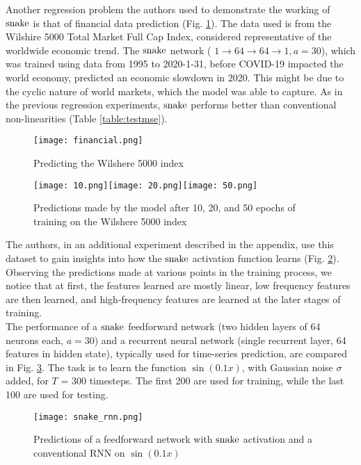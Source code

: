 Another regression problem the authors used to demonstrate the working of $ \operatorname{snake} $ is that of financial data prediction (Fig. \ref{fig:financial}). The data used is from the Wilshire 5000 Total Market Full Cap Index, considered representative of the worldwide economic trend. The $ \operatorname{snake} $ network ( $ 1 \rightarrow 64 \rightarrow 64 \rightarrow 1, a = 30 $), which was trained using data from 1995 to 2020-1-31, before COVID-19 impacted the world economy, predicted an economic slowdown in 2020. This might be due to the cyclic nature of world markets, which the model was able to capture. As in the previous regression experiments, $ \operatorname{snake} $ performs better than conventional non-linearities (Table \ref{table:testmse}).

\begin{figure}[h]
  \centering
  \texttt{[image: financial.png]}
  \caption{Predicting the Wilshere 5000 index}
  \label{fig:financial}
\end{figure}

\begin{figure}[h]
  \centering
  \texttt{[image: 10.png]}\texttt{[image: 20.png]}\texttt{[image: 50.png]}
  \caption{Predictions made by the model after 10, 20, and 50 epochs of training on the Wilshere 5000 index }
  \label{fig:preds_fin}
\end{figure}

The authors, in an additional experiment described in the appendix, use this dataset to gain insights into how the $ \operatorname{snake} $ activation function learns (Fig. \ref{fig:preds_fin}).
Observing the predictions made at various points in the training process, we notice that at first, the features learned are mostly linear, low frequency features are then learned, and high-frequency features are learned at the later stages of training. \\

 The performance of a $ \operatorname{snake} $ feedforward network (two hidden layers of 64 neurons each, $a=30$) and a recurrent neural network (single recurrent layer, 64 features in hidden state), typically used for time-series prediction, are compared in Fig. \ref{fig:rnn_preds}. The task is to learn the function $\sin(0.1x)$, with Gaussian noise $\sigma$ added, for $T$ = 300 timesteps. The first 200 are used for training, while the last 100 are used for testing. 

\begin{figure}[h]
\centering
\texttt{[image: snake\_rnn.png]}
\caption{Predictions of a feedforward network with $ \operatorname{snake} $ activation and a conventional RNN on $\sin(0.1x)$}
\label{fig:rnn_preds}
\end{figure}

